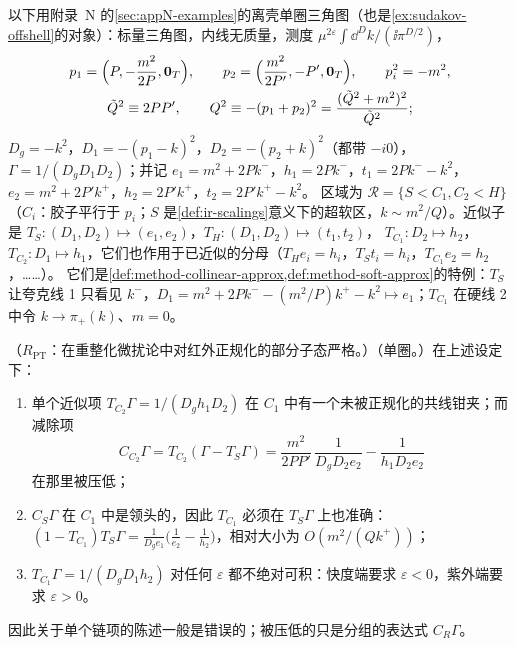 以下用附录~N 的\cref{sec:appN-examples}的离壳单圈三角图（也是\cref{ex:sudakov-offshell}的对象）：标量三角图，内线无质量，测度 $\mu^{2\varepsilon}\int\dd^Dk/(\ii\pi^{D/2})$，
\begin{equation}\label{eq:method-tri-kin}
\begin{gathered}
p_1=\Bigl(P,-\frac{m^2}{2P},\mathbf 0_T\Bigr),\qquad p_2=\Bigl(\frac{m^2}{2P'},-P',\mathbf 0_T\Bigr),\qquad p_i^2=-m^2,\\
\tilde Q^2\equiv2PP',\qquad Q^2\equiv-(p_1+p_2)^2=\frac{(\tilde Q^2+m^2)^2}{\tilde Q^2} ;
\end{gathered}
\end{equation}
$D_g=-k^2$，$D_1=-(p_1-k)^2$，$D_2=-(p_2+k)^2$（都带 $-i0$），$\Gamma=1/(D_gD_1D_2)$；并记 $e_1=m^2+2Pk^-$，$h_1=2Pk^-$，$t_1=2Pk^--k^2$，$e_2=m^2+2P'k^+$，$h_2=2P'k^+$，$t_2=2P'k^+-k^2$。
区域为 $\mathcal R=\{S<C_1,C_2<H\}$（$C_i$：胶子平行于 $p_i$；$S$ 是\cref{def:ir-scalings}意义下的超软区，$k\sim m^2/Q$）。近似子是 $T_S:(D_1,D_2)\mapsto(e_1,e_2)$，$T_H:(D_1,D_2)\mapsto(t_1,t_2)$，
$T_{C_1}:D_2\mapsto h_2$，$T_{C_2}:D_1\mapsto h_1$，它们也作用于已近似的分母（$T_He_i=h_i$，$T_St_i=h_i$，$T_{C_1}e_2=h_2$，……）。
它们是\cref{def:method-collinear-approx,def:method-soft-approx}的特例：$T_S$ 让夸克线 1 只看见 $k^-$，$D_1=m^2+2Pk^--(m^2/P)k^+-k^2\mapsto e_1$；$T_{C_1}$ 在硬线 2 中令 $k\to\pi_+(k)$、$m=0$。

\begin{example}\label{ex:method-naive-induction}
（$R_{\mathrm{PT}}$：在重整化微扰论中对红外正规化的部分子态严格。）（单圈。）在上述设定下：
\begin{enumerate}[label=(\alph*),leftmargin=2em,itemsep=1pt,topsep=2pt]
\item 单个近似项 $T_{C_2}\Gamma=1/(D_gh_1D_2)$ 在 $C_1$ 中有一个未被正规化的共线钳夹；而减除项
  \begin{equation}\label{eq:method-CC2}
  C_{C_2}\Gamma=T_{C_2}(\Gamma-T_S\Gamma)=\frac{m^2}{2PP'}\,\frac1{D_gD_2e_2}-\frac1{h_1D_2e_2}
  \end{equation}
  在那里被压低；
\item $C_S\Gamma$ 在 $C_1$ 中是领头的，因此 $T_{C_1}$ 必须在 $T_S\Gamma$ 上也准确：$(1-T_{C_1})T_S\Gamma=\frac1{D_ge_1}\bigl(\frac1{e_2}-\frac1{h_2}\bigr)$，相对大小为 $O(m^2/(Qk^+))$；
\item $T_{C_1}\Gamma=1/(D_gD_1h_2)$ 对任何 $\varepsilon$ 都不绝对可积：快度端要求 $\varepsilon<0$，紫外端要求 $\varepsilon>0$。
\end{enumerate}
因此关于单个链项的陈述一般是错误的；被压低的只是分组的表达式 $C_R\Gamma$。
\end{example}

